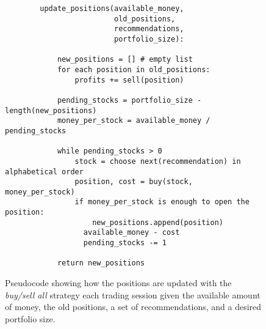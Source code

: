\begin{figure}
    \begin{verbatim}
        update_positions(available_money, 
                         old_positions,
                         recommendations,
                         portfolio_size):
                         
            new_positions = [] # empty list
            for each position in old_positions:
                profits += sell(position)            

            pending_stocks = portfolio_size - length(new_positions)
            money_per_stock = available_money / pending_stocks
            
            while pending_stocks > 0
                stock = choose next(recommendation) in alphabetical order 
                position, cost = buy(stock, money_per_stock)
                if money_per_stock is enough to open the position:
                    new_positions.append(position)
                  available_money - cost
                  pending_stocks -= 1
            
            return new_positions
    \end{verbatim}
    \caption{Pseudocode showing how the positions are updated with the \textit{buy/sell all}  strategy each trading session given the available amount of money, the old positions, a set of recommendations, and a desired portfolio size.}
    \label{fig:sell_all_pseudo}
\end{figure}